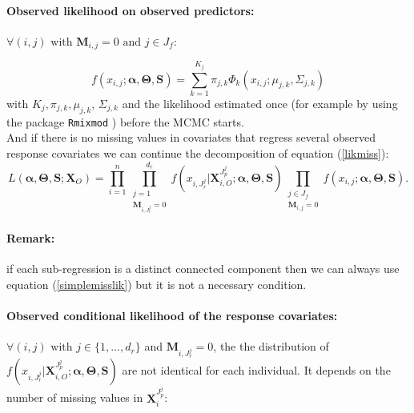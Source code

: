 \documentclass[12pt,a4paper]{report}
\begin{document}
\paragraph{Observed likelihood on observed predictors:} $\forall (i,j) \textrm{ with } \boldsymbol{M}_{i,j}= 0 \textrm{ and } j \in J_f $:

	 \begin{equation}
	 f(x_{i,j};\boldsymbol{\alpha},\boldsymbol{\Theta},\boldsymbol{S})=\sum_{k=1}^{K_j}\pi_{j,k}\Phi_k(x_{i,j};\mu_{j,k},\Sigma_{j,k}) \label{likmissdroite}
	 \end{equation} with $K_j,\pi_{j,k}, \mu_{j,k}$, $\Sigma_{j,k}$ and the likelihood estimated once (for example by using the package {\tt Rmixmod} \cite{packageRmixmod}) before the MCMC starts. 
	 \\
	 
And if there is no missing values in covariates that regress several observed response covariates we can continue the decomposition of equation (\ref{likmiss}):
	\begin{equation}
		L(\boldsymbol{\alpha},\boldsymbol{\Theta},\boldsymbol{S};\boldsymbol{X}_O)=\prod_{i=1}^n\prod_{\substack{j =1 \\ \boldsymbol{M}_{i,J_r^j}=0}}^{d_r}f(x_{i,J_r^j}|\boldsymbol{X}^{J_p^j}_{i,O};\boldsymbol{\alpha},\boldsymbol{\Theta},\boldsymbol{S})\prod_{\substack{j \in J_f \\ \boldsymbol{M}_{i,j}=0}}f(x_{i,j};\boldsymbol{\alpha},\boldsymbol{\Theta},\boldsymbol{S}). \label{simplemisslik}
\end{equation}	
\paragraph{Remark:} if each sub-regression is a distinct connected component then we can always use equation (\ref{simplemisslik}) but it is not a necessary condition.

	\paragraph{Observed conditional likelihood of the response covariates:} $\forall (i,j) \textrm{ with }  j \in \{1,\dots,d_r \}$ and $\boldsymbol{M}_{i,J_r^{j}}= 0$, the  the distribution of $f(x_{i,J_r^j}|\boldsymbol{X}_{i,O}^{J_p^j};\boldsymbol{\alpha},\boldsymbol{\Theta},\boldsymbol{S})$ are not identical for each individual. It depends on the number of missing values in $\boldsymbol{X}_i^{J_p^{j}} $:
	
\end{document}
